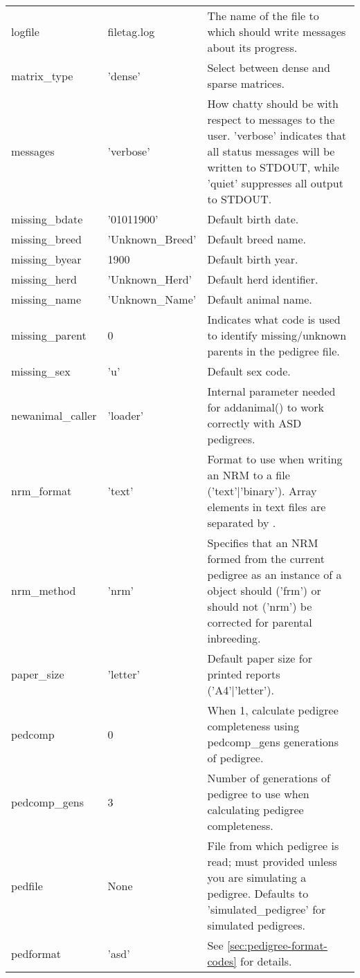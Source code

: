\begin{center}
\begin{xtabular}{l|l|p{4in}}
	logfile          & filetag.log  & The name of the file to which \PyPedal{} should write messages about its progress. \\
	matrix\_type	 & 'dense'	& Select between dense and sparse matrices.\\
	messages         & 'verbose'    & How chatty \PyPedal{} should be with respect to messages to the user.  'verbose' indicates that all status messages will be written to STDOUT, while 'quiet' suppresses all output to STDOUT. \\
	missing\_bdate    & '01011900'   & Default birth date. \\
	missing\_breed    & 'Unknown\_Breed'    & Default breed name.\\
	missing\_byear    & 1900         & Default birth year.\\
	missing\_herd	 & 'Unknown\_Herd'	& Default herd identifier.\\
	missing\_name     & 'Unknown\_Name'    & Default animal name.\\
	missing\_parent  & 0            & Indicates what code is used to identify missing/unknown parents in the pedigree file. \\
	missing\_sex	 & 'u'		& Default sex code.\\
	newanimal\_caller  & 'loader'   & Internal parameter needed for addanimal() to work correctly with ASD pedigrees. \\
	nrm\_format      & 'text'       & Format to use when writing an NRM to a file ('text'|'binary'). Array elements in text files are separated by .\\
	nrm\_method      & 'nrm'        & Specifies that an NRM formed from the current pedigree as an instance of a  object should ('frm') or should not ('nrm') be corrected for parental inbreeding. \\
	paper\_size       & 'letter'     & Default paper size for printed reports ('A4'|'letter'). \\
	pedcomp          & 0            & When 1, calculate pedigree completeness using pedcomp\_gens generations of pedigree. \\
	pedcomp\_gens    & 3            & Number of generations of pedigree to use when calculating pedigree completeness. \\
	pedfile          & None         & File from which pedigree is read; must provided unless you are simulating a pedigree. Defaults to 'simulated_pedigree' for simulated pedigrees. \\
	pedformat        & 'asd'        & See \ref{sec:pedigree-format-codes} for details. \\

\end{xtabular}
\end{center}
